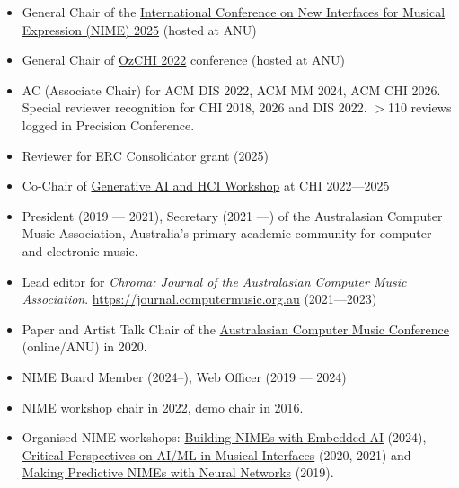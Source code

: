 \documentclass[11pt, a4paper, oneside]{article}
\begin{document}
\begin{itemize}

	\item General Chair of the \href{https://nime.org/web_archive/2025/}{International Conference on New Interfaces for Musical Expression (NIME) 2025} (hosted at ANU)

\item General Chair of \href{https://www.ozchi.org/2022/}{OzCHI 2022} conference (hosted at ANU)

\item AC (Associate Chair) for ACM DIS 2022, ACM MM 2024, ACM CHI 2026. Special reviewer recognition for CHI 2018, 2026 and DIS 2022. $>$110 reviews logged in Precision Conference. 

\item Reviewer for ERC Consolidator grant (2025)

\item Co-Chair of \href{https://generativeaiandhci.github.io}{Generative AI and HCI Workshop} at CHI 2022---2025

\item President (2019 --- 2021), Secretary (2021 ---) of the Australasian
	Computer Music Association, Australia's primary academic community for
	computer and electronic music.

\item Lead editor for \emph{Chroma: Journal of the Australasian Computer Music
	Association}. \url{https://journal.computermusic.org.au} (2021---2023)

\item Paper and Artist Talk Chair of the \href{https://australasian-computer-music-association.github.io/acmc2020/}{Australasian Computer Music Conference} (online/ANU)
	in 2020.

\item NIME Board Member (2024--), Web Officer (2019 --- 2024)
  
\item NIME workshop chair in 2022, demo chair in 2016.

\item Organised NIME workshops: 
	\href{https://smcclab.au/nime-embedded-ai/}{Building NIMEs with Embedded AI} (2024),
	\href{https://critical-ml-music-interfaces.github.io}{Critical Perspectives on AI/ML in Musical Interfaces} (2020, 2021) and 
	\href{https://cpmpercussion.github.io/creative-prediction/workshop/}{Making Predictive NIMEs with Neural Networks} (2019).

\end{itemize}
\end{document}
